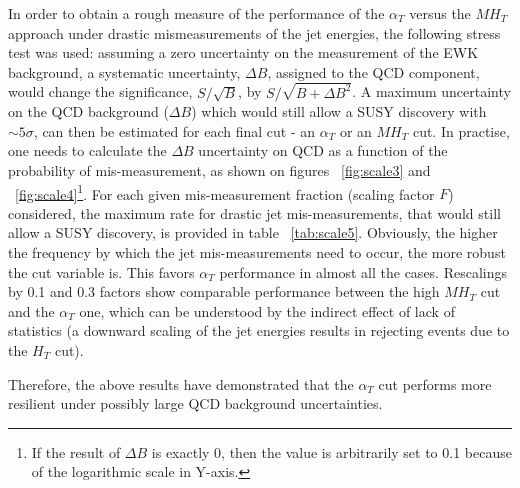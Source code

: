 In order to obtain a rough measure of the performance of the $\alpha_{T}$ versus the $MH_{T}$ approach under drastic mismeasurements of the jet energies, the following stress test was used: assuming a zero uncertainty on the measurement of the EWK background, a systematic uncertainty, $\Delta B$, assigned to the QCD component, would change the significance, $S/\sqrt{B}$, by $S/\sqrt{B + \Delta B^{2}}$. A maximum uncertainty on the QCD background ($\Delta B$) which would still allow a SUSY discovery with $\sim 5 \sigma$, can then be estimated for each final cut - an $\alpha_{T}$ or an $MH_{T}$ cut. In practise, one needs to calculate the $\Delta B$ uncertainty on QCD as a function of the probability of mis-measurement, as shown on figures ~\ref{fig:scale3} and ~\ref{fig:scale4}\footnote{If the result of $\Delta B$ is exactly 0, then the value is arbitrarily set to 0.1 because of the logarithmic scale in Y-axis.}. For each given mis-measurement fraction (scaling factor $F$) considered, the maximum rate for drastic jet mis-measurements, that would still allow a SUSY discovery, is provided in table ~\ref{tab:scale5}. Obviously, the higher the frequency by which the jet mis-measurements need to occur, the more robust the cut variable is. This favors $\alpha_{T}$ performance in almost all the cases. Rescalings by 0.1 and 0.3 factors show comparable performance between the high $MH_{T}$ cut and the $\alpha_{T}$ one, which can be understood by the indirect effect of lack of statistics (a downward scaling of the jet energies results in rejecting events due to the $H_{T}$ cut).

Therefore, the above results have demonstrated that the $\alpha_{T}$ cut performs more resilient under possibly large QCD background uncertainties.



